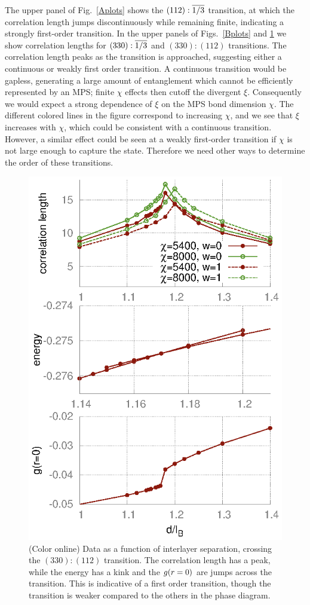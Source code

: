 The upper panel of Fig.~\ref{Aplots} shows the $(112):\overline{1/3}$ transition, at which the correlation length  jumps discontinuously while remaining finite, indicating a strongly first-order transition. 
In the upper panels of Figs.~\ref{Bplots} and \ref{Cplots} we show correlation lengths for $(330):\overline{1/3}$ and $(330):(112)$ transitions.
The correlation length peaks as the transition is approached, suggesting either a continuous or weakly first order transition.
A  continuous transition would be gapless, generating a large amount of entanglement which cannot be efficiently represented by an MPS; finite $\chi$ effects then cutoff the divergent $\xi$.
Consequently we would expect  a strong dependence of $\xi$ on the MPS bond dimension $\chi$.
The different colored lines in the figure correspond to increasing $\chi$, and we  see that $\xi$ increases with $\chi$, which could be consistent with a continuous transition. 
However, a similar effect could be seen at a weakly first-order transition if $\chi$ is not large enough to capture the state.
Therefore we need other ways to determine the order of these transitions.
 
\begin{figure}%
	\includegraphics[width=0.6\linewidth]{figures/C.eps}
	\caption{\label{Cplots} (Color online) Data as a function of interlayer separation, crossing the $(330):(112)$ transition. The correlation length has a peak, while the energy has a kink and the ${g}(r=0)$ are jumps across the transition. This is indicative of a first order transition, though the transition is weaker compared to the others in the phase diagram. }
\end{figure}

